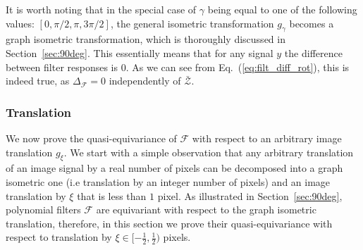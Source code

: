 \documentclass[10pt,journal,compsoc]{IEEEtran}
\newcommand{\renata}[1]{\textcolor{black}{#1}}
\newcommand{\mF}{\mathcal{F}}
\begin{document}
	It is worth noting that in the special case of $\gamma$ being equal to one of the following values: $[0, \pi/2, \pi, 3\pi/2]$, the general isometric transformation $g_\gamma$ becomes a graph isometric transformation, which is thoroughly discussed in Section~\ref{sec:90deg}. This essentially means that for any signal $y$ the difference between filter responses is $0$. As we can see from Eq.~(\ref{eq:filt_diff_rot}), this is indeed true, as $\Delta_\mathcal{F} = 0$ independently of $\bar{\mathcal{Z}}$.

	\subsubsection{Translation}
	\label{sec:trans}

	We now prove the quasi-equivariance of $\mathcal{F}$ with respect to an arbitrary image translation $g_\xi$. We start with a simple observation that any arbitrary translation of an image signal by a real number of pixels can be decomposed into a graph isometric one (i.e translation by an integer number of pixels) and an image translation by $\xi$ that is less than $1$ pixel. As illustrated in Section~\ref{sec:90deg}, polynomial filters $\mathcal{F}$ are equivariant with respect to the graph isometric translation, therefore, in this section we prove their quasi-equivariance with respect to translation by $\xi \in [-\frac{1}{2},\frac{1}{2})$ pixels.


\end{document}
